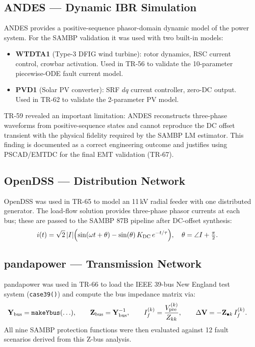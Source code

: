 \documentclass[12pt,a4paper]{article}
\begin{document}
\subsection{ANDES — Dynamic IBR Simulation}

ANDES provides a positive-sequence phasor-domain dynamic model of the power system.
For the SAMBP validation it was used with two built-in models:
\begin{itemize}
  \item \textbf{WTDTA1} (Type-3 DFIG wind turbine): rotor dynamics, RSC current
    control, crowbar activation.  Used in TR-56 to validate the 10-parameter
    piecewise-ODE fault current model.
  \item \textbf{PVD1} (Solar PV converter): SRF $dq$ current controller,
    zero-DC output.  Used in TR-62 to validate the 2-parameter PV model.
\end{itemize}

TR-59 revealed an important limitation: ANDES reconstructs three-phase
waveforms from positive-sequence states and cannot reproduce the DC offset
transient with the physical fidelity required by the SAMBP LM estimator.
This finding is documented as a correct engineering outcome and justifies
using PSCAD/EMTDC for the final EMT validation (TR-67).

\subsection{OpenDSS — Distribution Network}

OpenDSS was used in TR-65 to model an 11\,kV radial feeder with one
distributed generator.  The load-flow solution provides three-phase phasor
currents at each bus; these are passed to the SAMBP 87B pipeline after
DC-offset synthesis:
\[
  i(t) = \sqrt{2}\,|I|\Bigl(
    \sin(\omega t + \theta) - \sin(\theta)\,K_{\rm DC}\,e^{-t/\tau}
  \Bigr),
  \quad \theta = \angle I + \tfrac{\pi}{2}.
\]

\subsection{pandapower — Transmission Network}

pandapower was used in TR-66 to load the IEEE 39-bus New England test system
(\texttt{case39()}) and compute the bus impedance matrix via:
\[
  \mathbf{Y}_{\rm bus} = \texttt{makeYbus}(\ldots),\qquad
  \mathbf{Z}_{\rm bus} = \mathbf{Y}_{\rm bus}^{-1},\qquad
  I_f^{(k)} = \frac{V_{\rm pre}^{(k)}}{Z_{kk}},\qquad
  \Delta\mathbf{V} = -\mathbf{Z}_{\bullet k}\,I_f^{(k)}.
\]
All nine SAMBP protection functions were then evaluated against 12 fault
scenarios derived from this Z-bus analysis.
\end{document}
